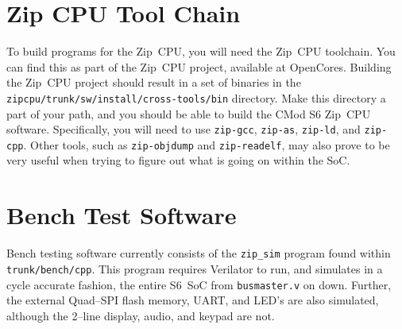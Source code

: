 \documentclass{gqtekspec}
\begin{document}
\section{Zip CPU Tool Chain}
To build programs for the Zip~CPU, you will need the Zip~CPU toolchain.  You
can find this as part of the Zip~CPU project, available at OpenCores.  Building
the Zip~CPU project should result in a set of binaries in the
\hbox{\tt zipcpu/trunk/sw/install/cross-tools/bin} directory.  Make this
directory a part of your path, and you should be able to build the CMod S6
Zip~CPU software.  Specifically, you will need to use {\tt zip-gcc},
{\tt zip-as}, {\tt zip-ld}, and {\tt zip-cpp}.  Other tools, such as
{\tt zip-objdump} and {\tt zip-readelf}, may also prove to be very useful when
trying to figure out what is going on within the SoC.

\section{Bench Test Software}

Bench testing software currently consists of the {\tt zip\_sim} program found
within {\tt trunk/bench/cpp}.  This program requires Verilator to run, and
simulates in a cycle accurate fashion, the entire S6~SoC from {\tt busmaster.v}
on down.  Further, the external Quad--SPI flash memory, UART, and LED's are
also simulated, although the 2--line display, audio, and keypad are not.
\end{document}
